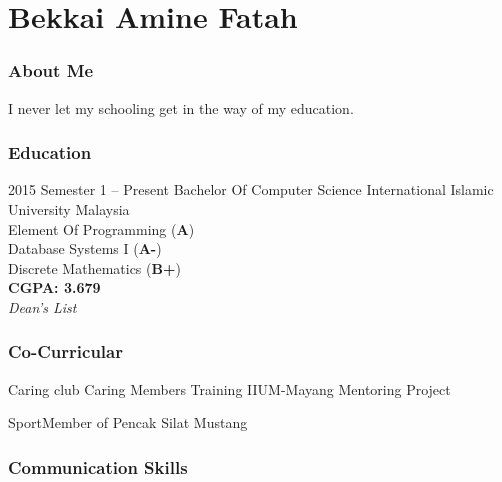 \documentclass[12pt]{tccv}
\begin{document}
  
\part{Bekkai Amine Fatah}


\section{About Me}

\begin{fquote}I never let my schooling get in the way of my 	education.
\end{fquote}


\section{Education}

\begin{eventlist}

\item{2015 Semester 1 -- Present}
     {Bachelor Of Computer Science}
     {\normalsize{International Islamic University Malaysia}}\\
     \small {Element Of Programming (\textbf{A})}\\
     \small{Database Systems I (\textbf{A-})}\\
     \small{Discrete Mathematics (\textbf{B+})}\\
     \textbf{CGPA: 3.679}\\
     \textit{Dean's List}
\end{eventlist}




\section{Co-Curricular}

\begin{factlist}
	\item{Caring club}
	{Caring Members Training\vspace{2mm}
	 IIUM-Mayang Mentoring Project}
	
	\item{Sport}{Member of Pencak Silat Mustang}
\end{factlist}


\section{Communication Skills}
\end{document}
